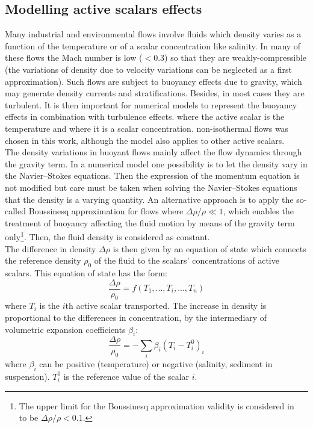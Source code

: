 \subsection{Modelling active scalars effects}\label{sec:boussinesq}

Many industrial and environmental flows involve fluids which density varies
as a function of the temperature or of a scalar concentration like salinity.
In many of these flows the Mach number is low ($< 0.3$) so that they are
weakly-compressible (the variations of density due to velocity variations
can be neglected as a first approximation).
Such flows are subject to buoyancy effects due to gravity,
which may generate density currents and stratifications.
Besides, in most cases they are turbulent.
It is then important for numerical models to represent the buoyancy
effects in combination with turbulence effects.
where the active scalar is the temperature and where it is a scalar concentration.
non-isothermal flows was chosen in this work, although the model also applies to other active scalars.\\

The density variations in buoyant flows mainly affect the flow dynamics through the gravity term.
In a numerical model one possibility is to let the density vary in the Navier--Stokes equations.
Then the expression of the momentum equation is not modified but
care must be taken when solving the Navier--Stokes equations that the density is a varying quantity.
An alternative approach is to apply the so-called Boussinesq approximation for flows where
$\Delta \rho/\rho \ll 1$,
which enables the treatment of buoyancy affecting the fluid motion by means of the gravity term
only\footnote{The upper limit for the Boussinesq approximation validity is considered
in~\cite{Viollet1997} to be $\Delta \rho/\rho < 0.1$.}.
Then, the fluid density is considered as constant.\\

The difference in density $\Delta\rho$ is then given by an equation of state which
connects the reference density $\rho_0$ of the fluid to the scalars' concentrations of active scalars.
This equation of state has the form:%
\begin{equation}
\dfrac{\Delta\rho}{\rho_{0}}=f(T_{1},...,T_{i},...,T_{n})
\end{equation}
where $T_{i}$ is the $i$th active scalar transported. The increase in density
is proportional to the differences in concentration, by the intermediary of
volumetric expansion coefficients $\beta_{i}$:%
\begin{equation}\label{eq:boussinesq_density_variation}
\dfrac{\Delta\rho}{\rho_{0}}=-\sum\limits_{i}\beta_{i}\left(  T_{i}-T_{i}%
^{0}\right)  _{i}%
\end{equation}
where $\beta_{i}$ can be positive (temperature) or negative (salinity, sediment in suspension).
$T_{i}^{0}$ is the reference value of the scalar $i$.

